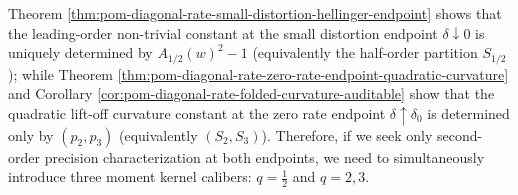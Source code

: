 
\begin{remark}\label{rem:pom-diagonal-rate-endpoint-three-kernel-principle}
Theorem \ref{thm:pom-diagonal-rate-small-distortion-hellinger-endpoint} shows that the leading-order non-trivial constant at the small distortion endpoint \(\delta\downarrow 0\) is uniquely determined by \(A_{1/2}(w)^2-1\) (equivalently the half-order partition \(S_{1/2}\));
while Theorem \ref{thm:pom-diagonal-rate-zero-rate-endpoint-quadratic-curvature} and Corollary \ref{cor:pom-diagonal-rate-folded-curvature-auditable} show that the quadratic lift-off curvature constant at the zero rate endpoint \(\delta\uparrow\delta_0\) is determined only by \((p_2,p_3)\) (equivalently \((S_2,S_3)\)).
Therefore, if we seek only second-order precision characterization at both endpoints, we need to simultaneously introduce three moment kernel calibers: \(q=\tfrac12\) and \(q=2,3\).
\end{remark}

